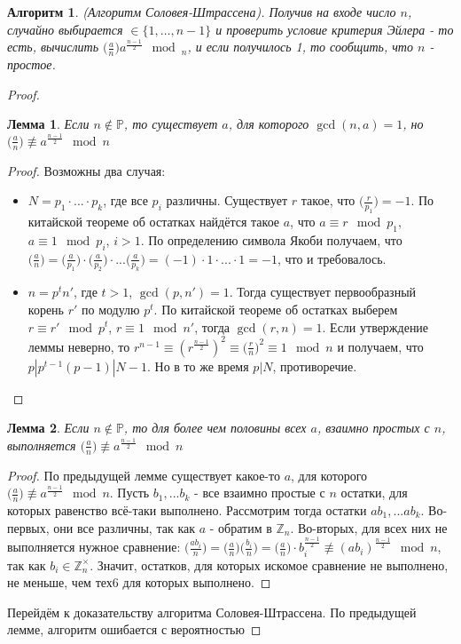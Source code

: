 \documentclass[a4paper]{article}
\theoremstyle{indented}
\newtheorem{lemma}{Лемма}
\newtheorem{alg}{Алгоритм}
\theoremstyle{definition}
\theoremstyle{remark}
\begin{document}
\begin{alg}
(Алгоритм Соловея-Штрассена). Получив на входе число $n$, случайно выбирается $\in \{1, \ldots, n-1\}$ и проверить условие критерия Эйлера - то есть, вычислить $\biggl( \frac{a}{n} \biggr) a^{\frac{n-1}{2}} \mod_n$, и если получилось 1, то сообщить, что $n$ - простое.
\end{alg}
\begin{proof}
\begin{lemma}
Если $n \notin \mathbb{P}$, то существует $a$, для которого $\gcd(n, a)=1$, но $\biggl( \frac{a}{n} \biggr) \not \equiv a^{\frac{n-1}{2}} \mod n$
\end{lemma}
\begin{proof}
Возможны два случая:
\begin{itemize}
\item $N=p_1\cdot ... \cdot p_k$, где все $p_i$ различны. Существует $r$ такое, что $\biggl( \frac{r}{p_1}\biggr)=-1$. По китайской теореме об остатках найдётся такое $a$, что $a \equiv r \mod p_1$, $a \equiv 1 \mod p_i$, $i>1$. По определению символа Якоби получаем, что $\biggl( \frac{a}{n} \biggr)=\biggl( \frac{a}{p_1} \biggr) \cdot \biggl( \frac{a}{p_2} \biggr) \cdot ... \biggl( \frac{a}{p_k} \biggr)=(-1) \cdot 1 \cdot ... \cdot 1=-1$, что и требовалось.
\item $n=p^tn'$, где $t>1$, $\gcd(p, n')=1$. Тогда существует первообразный корень $r'$ по модулю $p^t$. По китайской теореме об остатках выберем $r \equiv r' \mod p^t$, $r \equiv 1 \mod n'$, тогда $\gcd(r, n)=1$. Если утверждение леммы неверно, то $r^{n-1} \equiv (r^{\frac{n-1}{2}})^2 \equiv \biggl ( \frac{r}{n} \biggr)^2 \equiv 1 \mod n$ и получаем, что $p | p^{t-1}(p-1) | N-1$. Но в то же время $p | N$, противоречие.
\end{itemize}
\end{proof}
\begin{lemma}
Если $n \notin \mathbb{P}$, то для более чем половины всех $a$, взаимно простых с $n$, выполняется $\biggl( \frac{a}{n} \biggr) \not \equiv a^{\frac{n-1}{2}} \mod n$
\end{lemma}
\begin{proof}
По предыдущей лемме существует какое-то $a$, для которого $\biggl( \frac{a}{n} \biggr) \not \equiv a^{\frac{n-1}{2}} \mod n$. Пусть $b_1, ... b_k$ - все взаимно простые с $n$ остатки, для которых равенство всё-таки выполнено. Рассмотрим тогда остатки $ab_1, ... ab_k$. Во-первых, они все различны, так как $a$ - обратим в $\mathbb{Z}_n$. Во-вторых, для всех них не выполняется нужное сравнение: $\biggl (\frac{ab_i}{n} \biggr) = \biggl( \frac{a}{n} \biggr)\biggl( \frac{b_i}{n} \biggr)=\biggl( \frac{a}{n} \biggr) \cdot b_i^{\frac{n-1}{2}} \not \equiv (ab_i)^{\frac{n-1}{2}} \mod n$, так как $b_i \in \mathbb{Z}_{n}^{\times}$. Значит, остатков, для которых искомое сравнение не выполнено, не меньше, чем тех6 для которых выполнено. 
\end{proof}
Перейдём к доказательству алгоритма Соловея-Штрассена. По предыдущей лемме, алгоритм ошибается с вероятностью
 

\end{proof}
\end{document}
